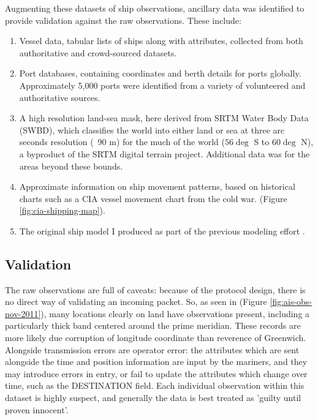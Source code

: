 Augmenting these datasets of ship observations, ancillary data was identified to provide validation against the raw observations. These include: 

\begin{enumerate}
  \item Vessel data, tabular lists of ships along with attributes, collected from both authoritative and crowd-sourced datasets.
  \item Port databases, containing coordinates and berth details for ports globally. Approximately 5,000 ports were identified from a variety of volunteered and authoritative sources.
  \item A high resolution land-sea mask, here derived from SRTM Water Body Data (SWBD), which classifies the world into either land or sea at three arc seconds resolution (~90 m) for the much of the world ($56\deg$ S to $60\deg$ N), a byproduct of the SRTM digital terrain project\cite{rabus2003shuttle}. Additional data was for the areas beyond these bounds.
  \item Approximate information on ship movement patterns, based on historical charts such as a CIA vessel movement chart from the cold war. (Figure \ref{fig:cia-shipping-map}).
  \item The original ship model I produced as part of the previous modeling effort \citep{Halpern2008}.
\end{enumerate}

\subsection{Validation}

The raw observations are full of caveats: because of the protocol design, there is no direct way of validating an incoming packet. So, as seen in (Figure \ref{fig:ais-obs-nov-2011}), many locations clearly on land have observations present, including a particularly thick band centered around the prime meridian. These records are more likely due corruption of longitude coordinate than reverence of Greenwich. Alongside transmission errors are operator error: the attributes which are sent alongside the time and position information are input by the mariners, and they may introduce errors in entry, or fail to update the attributes which change over time, such as the DESTINATION field. Each individual observation within this dataset is highly suspect, and generally the data is best treated as 'guilty until proven innocent'.

